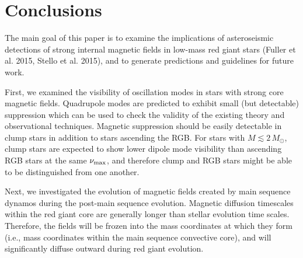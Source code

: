 \section{Conclusions}
\label{conclusion}

The main goal of this paper is to examine the implications of asteroseismic detections of strong internal magnetic fields in low-mass red giant stars (Fuller et al. 2015, Stello et al. 2015), and to generate predictions and guidelines for future work. 

First, we examined the visibility of oscillation modes in stars with strong core magnetic fields. Quadrupole modes are predicted to exhibit small (but detectable) suppression which can be used to check the validity of the existing theory and observational techniques. Magnetic suppression should be easily detectable in clump stars in addition to stars ascending the RGB. For stars with $M \lesssim 2 \, M_\odot$, clump stars are expected to show lower dipole mode visibility than ascending RGB stars at the same $\nu_{\rm max}$, and therefore clump and RGB stars might be able to be distinguished from one another.

Next, we investigated the evolution of magnetic fields created by main sequence dynamos during the post-main sequence evolution. Magnetic diffusion timescales within the red giant core are generally longer than stellar evolution time scales. Therefore, the fields will be frozen into the mass coordinates at which they form (i.e., mass coordinates within the main sequence convective core), and will significantly diffuse outward during red giant evolution.


  